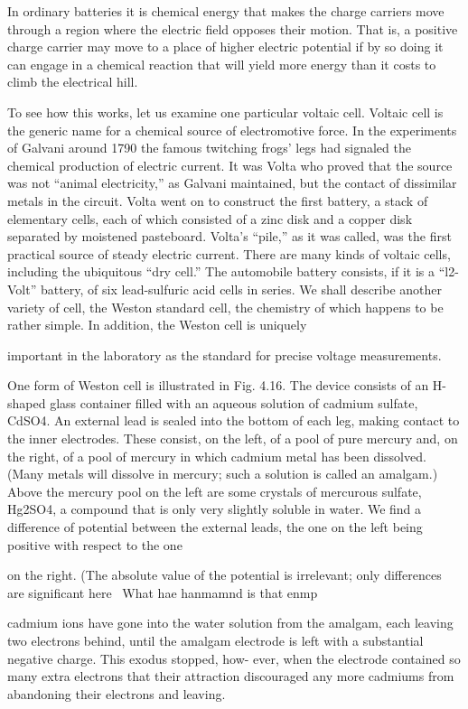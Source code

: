 In ordinary batteries it is chemical energy that makes the charge
carriers move through a region where the electric field opposes their
motion. That is, a positive charge carrier may move to a place of
higher electric potential if by so doing it can engage in a chemical
reaction that will yield more energy than it costs to climb the electrical
hill.

To see how this works, let us examine one particular voltaic cell.
Voltaic cell is the generic name for a chemical source of electromotive
force. In the experiments of Galvani around 1790 the famous
twitching frogs' legs had signaled the chemical production of electric
current. It was Volta who proved that the source was not ``animal
electricity,'' as Galvani maintained, but the contact of dissimilar
metals in the circuit. Volta went on to construct the first battery, a
stack of elementary cells, each of which consisted of a zinc disk and
a copper disk separated by moistened pasteboard. Volta's ``pile,'' as
it was called, was the first practical source of steady electric current.
There are many kinds of voltaic cells, including the ubiquitous ``dry
cell.'' The automobile battery consists, if it is a ``l2-Volt'' battery, of
six lead-sulfuric acid cells in series. We shall describe another
variety of cell, the Weston standard cell, the chemistry of which
happens to be rather simple. In addition, the Weston cell is uniquely

important in the laboratory as the standard for precise voltage
measurements.

One form of Weston cell is illustrated in Fig. 4.16. The device
consists of an H-shaped glass container filled with an aqueous solution
of cadmium sulfate, CdSO4. An external lead is sealed into the
bottom of each leg, making contact to the inner electrodes. These
consist, on the left, of a pool of pure mercury and, on the right, of a
pool of mercury in which cadmium metal has been dissolved.
(Many metals will dissolve in mercury; such a solution is called an
amalgam.) Above the mercury pool on the left are some crystals of
mercurous sulfate, Hg2SO4, a compound that is only very slightly
soluble in water. We find a difference of potential between the external
leads, the one on the left being positive with respect to the one

on the right. (The absolute value of the potential is irrelevant; only
differences are significant here \ What hae hanmamnd is that enmp

cadmium ions have gone into the water solution from the amalgam,
each leaving two electrons behind, until the amalgam electrode is
left with a substantial negative charge. This exodus stopped, how-
ever, when the electrode contained so many extra electrons that their
attraction discouraged any more cadmiums from abandoning their
electrons and leaving.

